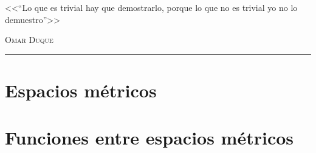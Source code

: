 \documentclass[12pt,a4paper]{book}
\begin{document}
\renewcommand{\contentsname}{\vspace{-1.5cm} Contenido \vspace{-2cm} }


\begin{titlepage}
\vspace*{2cm}

\noindent
\vspace*{0.5cm}

\vspace{1.5cm}
\epigraph{<<``Lo que es trivial hay que demostrarlo, porque lo que no es trivial yo no lo demuestro''>>}%
{ \textsc{Omar Duque}}
\null\vfill
\vspace*{1cm}
\noindent
\hfill
\begin{minipage}{0.7\linewidth}
    \begin{flushright}
        \printauthor
    \end{flushright}
\end{minipage}
%
\begin{minipage}{0.02\linewidth}
    \rule{1pt}{140pt}
\end{minipage}
\titlepagedecoration
\end{titlepage}


\tableofcontents
\cleardoublepage


\chapter{Espacios métricos}

\chapter{Funciones entre espacios métricos}

\end{document}
